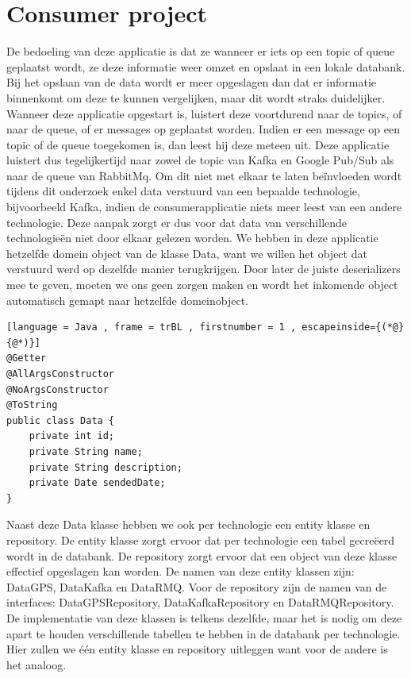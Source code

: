 \section{Consumer project}
De bedoeling van deze applicatie is dat ze wanneer er iets op een topic of queue geplaatst wordt, ze deze informatie weer omzet en opslaat in een lokale databank. Bij het opslaan van de data wordt er meer opgeslagen dan dat er informatie binnenkomt om deze te kunnen vergelijken, maar dit wordt straks duidelijker. Wanneer deze applicatie opgestart is, luistert deze voortdurend naar de topics, of naar de queue, of er messages op geplaatst worden. Indien er een message op een topic of de queue toegekomen is, dan leest hij deze meteen uit. Deze applicatie luistert dus tegelijkertijd naar zowel de topic van Kafka en Google Pub/Sub als naar de queue van RabbitMq. Om dit niet met elkaar te laten beïnvloeden wordt tijdens dit onderzoek enkel data verstuurd van een bepaalde technologie, bijvoorbeeld Kafka, indien de consumerapplicatie niets meer leest van een andere technologie. Deze aanpak zorgt er dus voor dat data van verschillende technologieën niet door elkaar gelezen worden. We hebben in deze applicatie hetzelfde domein object van de klasse Data, want we willen het object dat verstuurd werd op dezelfde manier terugkrijgen. Door later de juiste deserializers mee te geven, moeten we ons geen zorgen maken en wordt het inkomende object automatisch gemapt naar hetzelfde domeinobject.
\begin{lstlisting}[language = Java , frame = trBL , firstnumber = 1 , escapeinside={(*@}{@*)}]
@Getter
@AllArgsConstructor
@NoArgsConstructor
@ToString
public class Data {
    private int id;
    private String name;
    private String description;
    private Date sendedDate;
}
\end{lstlisting}

Naast deze Data klasse hebben we ook per technologie een entity klasse en repository. De entity klasse zorgt ervoor dat per technologie een tabel gecreëerd wordt in de databank. De repository zorgt ervoor dat een object van deze klasse effectief opgeslagen kan worden. De namen van deze entity klassen zijn: DataGPS, DataKafka en DataRMQ. Voor de repository zijn de namen van de interfaces: DataGPSRepository, DataKafkaRepository en DataRMQRepository. De implementatie van deze klassen is telkens dezelfde, maar het is nodig om deze apart te houden verschillende tabellen te hebben in de databank per technologie. Hier zullen we één entity klasse en repository uitleggen want voor de andere is het analoog.

